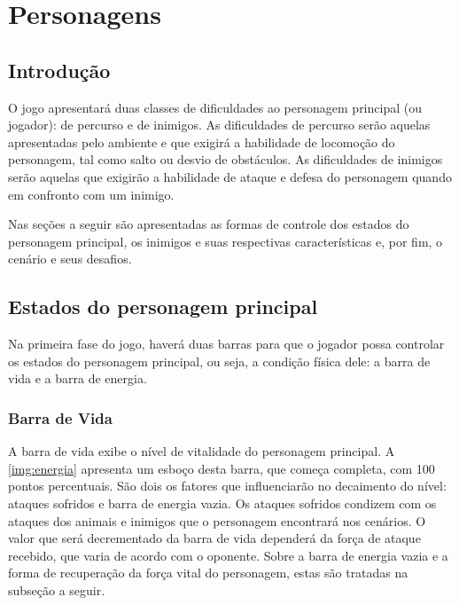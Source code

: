 \section{Personagens}

\subsection{Introdução}
O jogo apresentará duas classes de dificuldades ao personagem principal 
(ou jogador): de percurso e de inimigos. As dificuldades de percurso serão 
aquelas apresentadas pelo ambiente e que exigirá a habilidade de locomoção 
do personagem, tal como salto ou desvio de obstáculos. As dificuldades 
de inimigos serão aquelas que exigirão a habilidade de ataque e defesa 
do personagem quando em confronto com um inimigo.

Nas seções a seguir são apresentadas as formas de controle dos estados 
do personagem principal, os inimigos e suas respectivas características 
e, por fim, o cenário e seus desafios.

\subsection{Estados do personagem principal}
Na primeira fase do jogo, haverá duas barras para que o jogador possa 
controlar os estados do personagem principal, ou seja, a condição física 
dele: a barra de vida e a barra de energia.
 
\subsubsection{Barra de Vida}
A barra de vida exibe o nível de vitalidade do personagem principal. 
A \ref{img:energia} apresenta um esboço desta barra, que começa completa, com
100 pontos percentuais. São dois os fatores que influenciarão no 
decaimento do nível: ataques sofridos e barra de energia vazia. Os ataques 
sofridos condizem com os ataques dos animais e inimigos que o personagem encontrará
nos cenários. O valor que será decrementado da barra de 
vida dependerá da força de ataque recebido, que varia de acordo com o oponente. 
Sobre a barra de energia vazia e a forma de recuperação da força vital do personagem, 
estas são tratadas na subseção a seguir.

